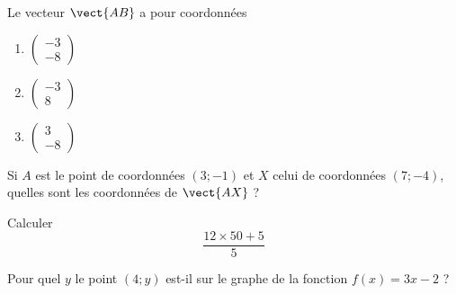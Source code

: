 \begin{MentalActivity}


\begin{mental}

        \begin{center}
   
        \end{center}

                Le vecteur \( \vect{ AB }\) a pour coordonnées 
                \begin{enumerate}
                    \item
        $                
    \begin{pmatrix}
       -3 \\ 
       -8 
   \end{pmatrix}$
   \item
   \( \begin{pmatrix}
       -3 \\ 
       8 
   \end{pmatrix}\)
   \item
   \( \begin{pmatrix}
       3 \\ 
       -8 
   \end{pmatrix}\)
                \end{enumerate}
            
\end{mental}

\begin{mental}

            Si \( A\) est le point de coordonnées \( (3;-1)\) et \( X\) celui de coordonnées \( (7;-4)\), quelles sont les coordonnées de \( \vect{ AX }\) ?

\end{mental}

\begin{mental}

    Calculer
    \begin{equation}
        \frac{ 12\times 50+5 }{ 5 }
    \end{equation}


\end{mental}

\begin{mental}

    Pour quel \( y\) le point \( (4;y)\) est-il sur le graphe de la fonction \( f(x)=3x-2\) ?

\end{mental}


\end{MentalActivity}
